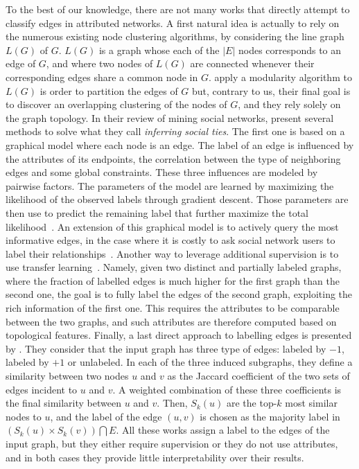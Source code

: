 To the best of our knowledge, there are not many works that directly attempt to classify edges in
attributed networks. A first natural idea is actually to rely on the numerous existing node clustering
algorithms, by considering the line graph $L(G)$ of $G$. $L(G)$ is a graph whose each of the $|E|$
nodes corresponds to an edge of $G$, and where two nodes of $L(G)$ are connected whenever their
corresponding edges share a common node in $G$. \Textcite{LineGraph09} apply a modularity algorithm
to $L(G)$ is order to partition the edges of $G$ but, contrary to us, their final goal is to
discover an overlapping clustering of the nodes of $G$, and they rely solely on the graph topology.
In their review of mining social networks, \textcite[Section 2.3]{SemanticMining15} present several
methods to solve what they call \emph{inferring social ties}. The first one is based on a graphical
model where each node is an edge. The label of an edge is influenced by the attributes of its
endpoints, the correlation between the type of neighboring edges and some global constraints. These
three influences are modeled by pairwise factors. The parameters of the model are learned by
maximizing the likelihood of the observed labels through gradient descent. Those parameters are then
use to predict the remaining label that further maximize the total
likelihood~\autocite{graphicalModelTies11}. An extension of this graphical model is to actively
query the most informative edges, in the case where it is costly to ask social network users to label
their relationships~\autocite{Zhuang2012}. Another way to leverage additional supervision is to use
transfer learning~\autocite{transferTiesPred16}. Namely, given two distinct and partially labeled
graphs, where the fraction of labelled edges is much higher for the first graph than the second one, the goal
is to fully label the edges of the second graph, exploiting the rich information of the first one.
This requires the attributes to be comparable between the two graphs, and such attributes are
therefore computed based on topological features. Finally, a last direct approach to labelling edges
is presented by \textcite{Aggarwal2016a}. They consider that the input graph has three type of
edges: labeled by $-1$, labeled by $+1$ or unlabeled. In each of the three induced subgraphs, they
define a similarity between two nodes $u$ and $v$ as the Jaccard coefficient of the two sets of
edges incident to $u$ and $v$. A weighted combination of these three coefficients is the final
similarity between $u$ and $v$. Then, $S_k(u)$ are the top-$k$ most similar nodes to $u$, and the
label of the edge $(u,v)$ is chosen as the majority label in $\left( S_k(u)\times S_k(v) \right) \bigcap E$.
All these works assign a label to the edges of the input graph, but they either require supervision or
they do not use attributes, and in both cases they provide little interpretability over their results.

